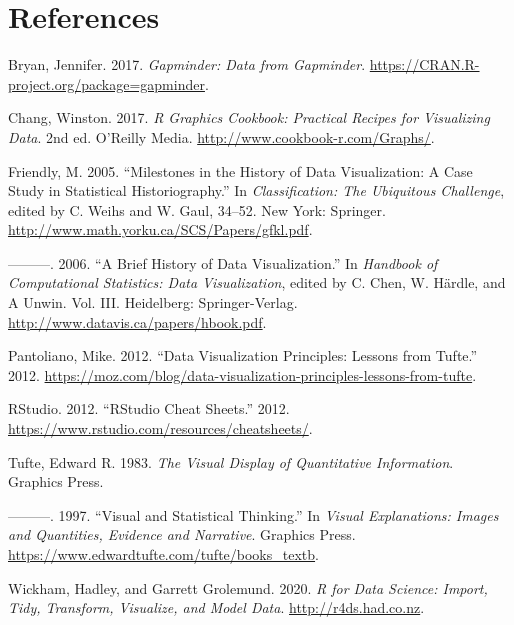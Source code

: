 \documentclass[
]{article}
\newlength{\cslhangindent}
\newlength{\cslentryspacingunit} %
\newenvironment{CSLReferences}[2] %
 {%
  \setlength{\parindent}{0pt}
  \ifodd #1
  \let\oldpar\par
  \def\par{\hangindent=\cslhangindent\oldpar}
  \fi
  \setlength{\parskip}{#2\cslentryspacingunit}
 }%
 {}
\begin{document}
\hypertarget{references}{%
\section{References}\label{references}}

\footnotesize

\hypertarget{refs}{}
\begin{CSLReferences}{1}{0}
\leavevmode{}%
Bryan, Jennifer. 2017. \emph{Gapminder: Data from Gapminder}.
\url{https://CRAN.R-project.org/package=gapminder}.

\leavevmode{}%
Chang, Winston. 2017. \emph{R Graphics Cookbook: Practical Recipes for
Visualizing Data}. 2nd ed. O'Reilly Media.
\url{http://www.cookbook-r.com/Graphs/}.

\leavevmode{}%
Friendly, M. 2005. {``Milestones in the History of Data Visualization: A
Case Study in Statistical Historiography.''} In \emph{Classification:
The Ubiquitous Challenge}, edited by C. Weihs and W. Gaul, 34--52. New
York: Springer. \url{http://www.math.yorku.ca/SCS/Papers/gfkl.pdf}.

\leavevmode{}%
---------. 2006. {``A Brief History of Data Visualization.''} In
\emph{Handbook of Computational Statistics: Data Visualization}, edited
by C. Chen, W. Härdle, and A Unwin. Vol. III. Heidelberg:
Springer-Verlag. \url{http://www.datavis.ca/papers/hbook.pdf}.

\leavevmode{}%
Pantoliano, Mike. 2012. {``Data Visualization Principles: Lessons from
Tufte.''} 2012.
\url{https://moz.com/blog/data-visualization-principles-lessons-from-tufte}.

\leavevmode{}%
RStudio. 2012. {``RStudio Cheat Sheets.''} 2012.
\url{https://www.rstudio.com/resources/cheatsheets/}.

\leavevmode{}%
Tufte, Edward R. 1983. \emph{The Visual Display of Quantitative
Information}. Graphics Press.

\leavevmode{}%
---------. 1997. {``Visual and Statistical Thinking.''} In \emph{Visual
Explanations: Images and Quantities, Evidence and Narrative}. Graphics
Press. \url{https://www.edwardtufte.com/tufte/books_textb}.

\leavevmode{}%
Wickham, Hadley, and Garrett Grolemund. 2020. \emph{R for Data Science:
Import, Tidy, Transform, Visualize, and Model Data}.
\url{http://r4ds.had.co.nz}.

\end{CSLReferences}
\end{document}
